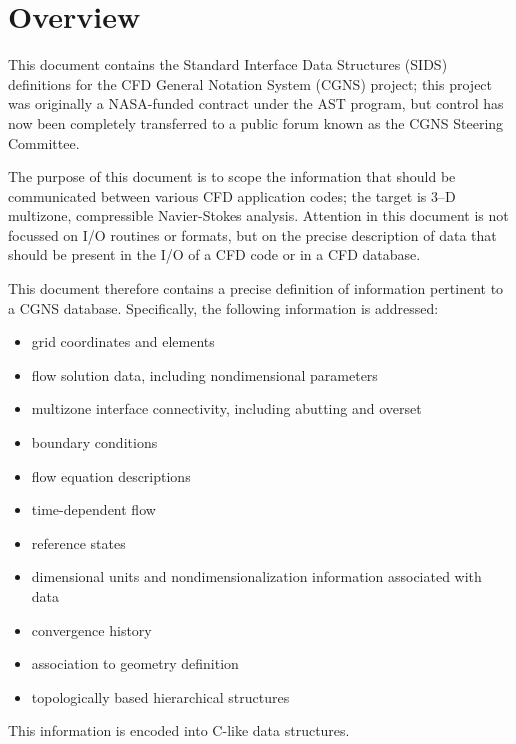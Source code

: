 \hypertarget{overview}{}
\section*{Overview}
\thispagestyle{plain}

This document contains the Standard Interface Data Structures (SIDS)
definitions for the CFD General Notation System (CGNS) project; this
project was originally a NASA-funded contract under the AST program, but
control has now been completely transferred to a public forum known as
the CGNS Steering Committee.

The purpose of this document is to scope the information that should be
communicated between various CFD application codes; the target is 3--D
multizone, compressible Navier-Stokes analysis.
Attention in this document is not focussed on I/O routines or formats,
but on the precise description of data that should be present in the I/O
of a CFD code or in a CFD database.

This document therefore contains a precise definition of information
pertinent to a CGNS database.
Specifically, the following information is addressed:
\begin{itemize}
\item grid coordinates and elements
\item flow solution data, including nondimensional parameters
\item multizone interface connectivity, including abutting and overset
\item boundary conditions
\item flow equation descriptions
\item time-dependent flow
\item reference states
\item dimensional units and nondimensionalization information associated
      with data
\item convergence history
\item association to geometry definition
\item topologically based hierarchical structures
\end{itemize}
This information is encoded into C-like data structures.
